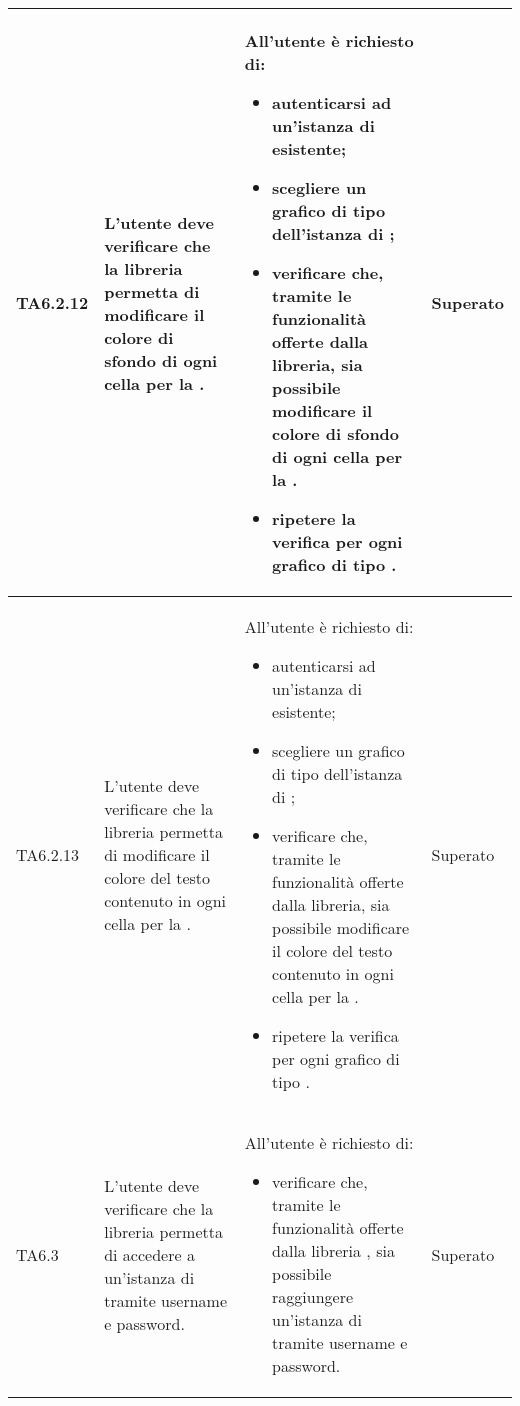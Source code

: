 \begin{longtabu}{| X[0.5] | X | X | X[0.5] |}
	TA6.2.12 & L'utente  deve verificare che la libreria permetta di modificare il colore di sfondo di ogni cella per la .
		
		& All'utente  è richiesto di:
		\begin{itemize}
			\item autenticarsi ad un'istanza di \projectname{} esistente;
			\item scegliere un grafico di tipo  dell'istanza di \projectname{};
			\item verificare che, tramite le funzionalità offerte dalla libreria, sia possibile modificare il colore di sfondo di ogni cella per la .
			\item ripetere la verifica per ogni grafico di tipo .
		\end{itemize}
& Superato \\ \hline

	TA6.2.13 & L'utente  deve verificare che la libreria permetta di modificare il colore del testo contenuto in ogni cella per la .
		
		& All'utente  è richiesto di:
		\begin{itemize}
			\item autenticarsi ad un'istanza di \projectname{} esistente;
			\item scegliere un grafico di tipo  dell'istanza di \projectname{};
			\item verificare che, tramite le funzionalità offerte dalla libreria, sia possibile modificare il colore del testo contenuto in ogni cella per la .
			\item ripetere la verifica per ogni grafico di tipo .
		\end{itemize}
& Superato \\ \hline

	TA6.3 & L'utente  deve verificare che la libreria  permetta di accedere a un'istanza di \projectname{} tramite username e password.
		
		& All'utente  è richiesto di:
		\begin{itemize}
			\item verificare che, tramite le funzionalità offerte dalla libreria , sia possibile raggiungere un'istanza di \projectname{} tramite username e password.
		\end{itemize}
& Superato \\ \hline


\end{longtabu}
